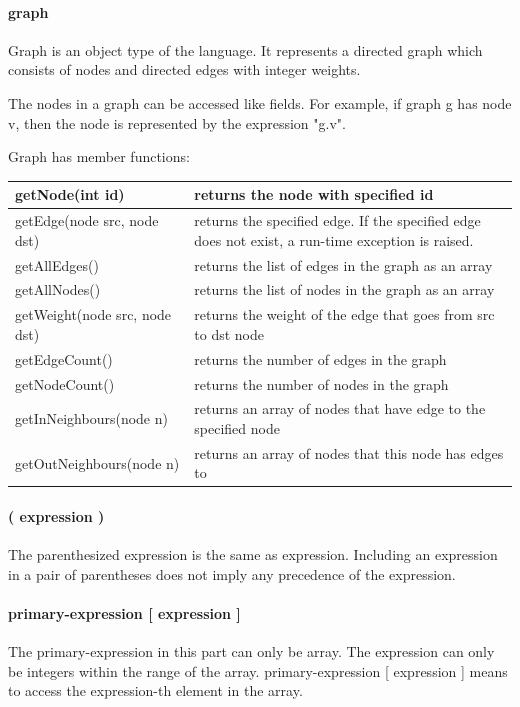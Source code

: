 \documentclass[a4paper,12pt]{article}
\begin{document}
\paragraph{graph}
Graph is an object type of the language. It represents a directed graph which consists of nodes and directed edges with integer weights. 

The nodes in a graph can be accessed like fields. For example, if graph g has node v, then the node is represented by the expression "g.v".

Graph has member functions:
\begin{center}
\begin{tabular}{| l | p{10cm} |}
\hline
	getNode(int id)	&	returns the node with specified id \\ \hline
	getEdge(node src, node dst)	&	returns the specified edge. If the specified edge does not exist, a run-time exception is raised.\\ \hline
	getAllEdges()	&	returns the list of edges in the graph as an array\\ \hline
	getAllNodes()	&	returns the list of nodes in the graph as an array\\ \hline
	getWeight(node src, node dst) 	&	returns the weight of the edge that goes from src to dst node \\ \hline
	getEdgeCount() 	&  returns the number of edges in the graph \\ \hline
	getNodeCount()	&  returns the number of nodes in the graph \\  \hline
	getInNeighbours(node n)	&	returns an array of nodes that have edge to the specified node \\ \hline
	getOutNeighbours(node n) &	returns an array of nodes that this node has edges to \\ \hline

	
\end{tabular}
\end{center}

\paragraph{( expression )}
The parenthesized expression is the same as expression. Including an expression in a pair of parentheses does not imply any precedence of the expression.

\paragraph{primary-expression {[} expression {]} }
The primary-expression in this part can only be array. The expression can only be integers within the range of the array. primary-expression [ expression ] means to access the expression-th element in the array.
\end{document}
